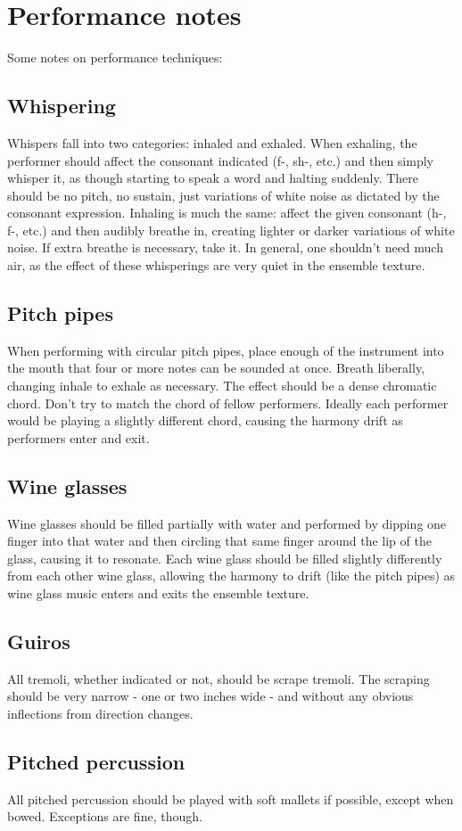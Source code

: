 \section{Performance notes}

Some notes on performance techniques:

\subsection{Whispering}

Whispers fall into two categories: inhaled and exhaled. When exhaling, the
performer should affect the consonant indicated (f-, sh-, etc.) and then simply
whisper it, as though starting to speak a word and halting suddenly. There
should be no pitch, no sustain, just variations of white noise as dictated by
the consonant expression. Inhaling is much the same: affect the given consonant
(h-, f-, etc.) and then audibly breathe in, creating lighter or darker
variations of white noise. If extra breathe is necessary, take it. In general,
one shouldn't need much air, as the effect of these whisperings are very quiet
in the ensemble texture.

\subsection{Pitch pipes}

When performing with circular pitch pipes, place enough of the instrument into
the mouth that four or more notes can be sounded at once. Breath liberally,
changing inhale to exhale as necessary. The effect should be a dense chromatic
chord. Don't try to match the chord of fellow performers. Ideally each
performer would be playing a slightly different chord, causing the harmony
drift as performers enter and exit.

\subsection{Wine glasses}

Wine glasses should be filled partially with water and performed by dipping one
finger into that water and then circling that same finger around the lip of the
glass, causing it to resonate. Each wine glass should be filled slightly
differently from each other wine glass, allowing the harmony to drift (like the
pitch pipes) as wine glass music enters and exits the ensemble texture.

\subsection{Guiros}

All tremoli, whether indicated or not, should be scrape tremoli. The scraping
should be very narrow - one or two inches wide - and without any obvious
inflections from direction changes.

\subsection{Pitched percussion}

All pitched percussion should be played with soft mallets if possible, except
when bowed. Exceptions are fine, though.
